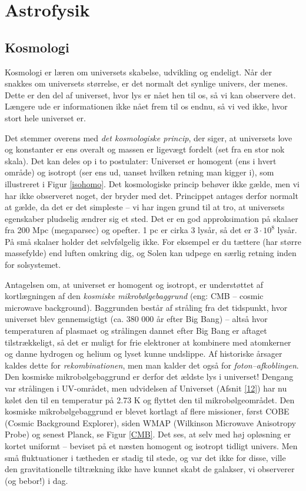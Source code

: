 \chapter{Astrofysik}
\section{Kosmologi}
Kosmologi er læren om universets skabelse, udvikling og endeligt. Når der snakkes om universets størrelse, er det normalt det synlige univers, der menes. Dette er den del af universet, hvor lys er nået hen til os, så vi kan observere det. Længere ude er informationen ikke nået frem til os endnu, så vi ved ikke, hvor stort hele universet er. 

Det stemmer overens med \emph{det kosmologiske princip}, der siger, at universets love og konstanter er ens overalt og massen er ligevægt fordelt (set fra en stor nok skala). Det kan deles op i to postulater: Universet er homogent (ens i hvert område) og isotropt (ser ens ud, uanset hvilken retning man kigger i), som illustreret i Figur \ref{isohomo}. Det kosmologiske princip behøver ikke gælde, men vi har ikke observeret noget, der bryder med det. Princippet antages derfor normalt at gælde, da det er det simpleste -- vi har ingen grund til at tro, at universets egenskaber pludselig ændrer sig et sted. Det er en god approksimation på skalaer fra 200 Mpc (megaparsec) og opefter. 1 pc er cirka 3 lysår, så det er $3\cdot 10^8$ lysår. På små skalaer holder det selvfølgelig ikke. For eksempel er du tættere (har større massefylde) end luften omkring dig, og Solen kan udpege en særlig retning inden for solsystemet.

Antagelsen om, at universet er homogent og isotropt, er understøttet af
kortlægningen af den \emph{kosmiske mikrobølgebaggrund} (eng: CMB – cosmic microwave
background). Baggrunden består af stråling fra det tidspunkt, hvor universet blev
gennemsigtigt (ca. 380 000 år efter Big Bang) – altså hvor temperaturen af plasmaet
og strålingen dannet efter Big Bang er aftaget tilstrækkeligt, så det er muligt for frie elektroner at 
kombinere med atomkerner og danne hydrogen og helium
og lyset kunne undslippe. Af historiske årsager kaldes dette for \emph{rekombinationen}, men man kalder det også for \emph{foton--afkoblingen}. Den kosmiske mikrobølgebaggrund er derfor det ældste
lys i universet! Dengang var strålingen i UV-området, men udvidelsen af Universet
(Afsnit \ref{12}) har nu kølet den til en temperatur på 2.73 K og flyttet den til mikrobølgeområdet. Den kosmiske mikrobølgebaggrund er blevet kortlagt af flere
missioner, først COBE (Cosmic Background Explorer), siden WMAP (Wilkinson
Microwave Anisotropy Probe) og senest Planck, se Figur \ref{CMB}. Det ses, at selv med høj opløsning er kortet uniformt – beviset på et næsten
homogent og isotropt tidligt univers. Men små fluktuationer i tætheden er stadig til
stede, og var det ikke for disse, ville den gravitationelle tiltrækning ikke have kunnet
skabt de galakser, vi observerer (og bebor!) i dag.

